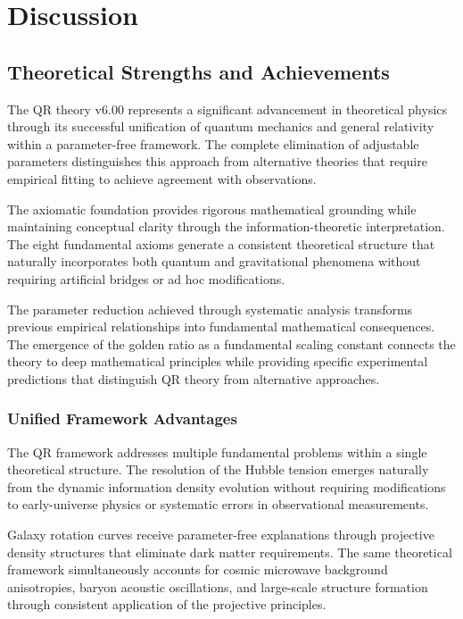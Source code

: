 \section{Discussion}
\label{sec:discussion}

\subsection{Theoretical Strengths and Achievements}
\label{subsec:theoretical-strengths}

The QR theory v6.00 represents a significant advancement in theoretical physics through its successful unification of quantum mechanics and general relativity within a parameter-free framework. The complete elimination of adjustable parameters distinguishes this approach from alternative theories that require empirical fitting to achieve agreement with observations.

The axiomatic foundation provides rigorous mathematical grounding while maintaining conceptual clarity through the information-theoretic interpretation. The eight fundamental axioms generate a consistent theoretical structure that naturally incorporates both quantum and gravitational phenomena without requiring artificial bridges or ad hoc modifications.

The parameter reduction achieved through systematic analysis transforms previous empirical relationships into fundamental mathematical consequences. The emergence of the golden ratio as a fundamental scaling constant connects the theory to deep mathematical principles while providing specific experimental predictions that distinguish QR theory from alternative approaches.

\subsubsection{Unified Framework Advantages}
\label{subsubsec:unified-advantages}

The QR framework addresses multiple fundamental problems within a single theoretical structure. The resolution of the Hubble tension emerges naturally from the dynamic information density evolution without requiring modifications to early-universe physics or systematic errors in observational measurements.

Galaxy rotation curves receive parameter-free explanations through projective density structures that eliminate dark matter requirements. The same theoretical framework simultaneously accounts for cosmic microwave background anisotropies, baryon acoustic oscillations, and large-scale structure formation through consistent application of the projective principles.

